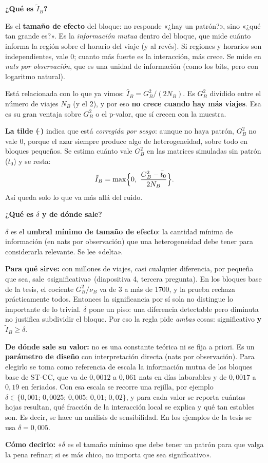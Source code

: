 \documentclass[11pt,a4paper]{article}
\newcommand{\cajainicio}[3]{\par\medskip\noindent
  \begin{lrbox}{\cajabox}\begin{minipage}{\dimexpr\linewidth-2\fboxsep-2\fboxrule\relax}%
  \textbf{\color{#1}#3}\par\smallskip}
\newcommand{\cajafin}[2]{\end{minipage}\end{lrbox}\fcolorbox{#1}{#2}{\usebox{\cajabox}}\par\medskip}
\newenvironment{nota}[1]{\cajainicio{acc}{acc!7}{#1}}{\cajafin{acc}{acc!7}}
\newcommand{\STCC}{ST-CC}
\begin{document}
\begin{nota}{¿Qué es $\tilde I_B$?}
Es el \textbf{tamaño de efecto} del bloque: no responde «¿hay un patrón?», sino «¿qué tan grande es?». Es la \emph{información mutua} dentro del bloque, que mide cuánto informa la región sobre el horario del viaje (y al revés). Si regiones y horarios son independientes, vale 0; cuanto más fuerte es la interacción, más crece. Se mide en \emph{nats por observación}, que es una unidad de información (como los bits, pero con logaritmo natural).

Está relacionada con lo que ya vimos: $\hat I_B=G^2_B/(2N_B)$. Es $G^2_B$ dividido entre el número de viajes $N_B$ (y el 2), y por eso \textbf{no crece cuando hay más viajes}. Esa es su gran ventaja sobre $G^2_B$ o el p-valor, que sí crecen con la muestra.

\textbf{La tilde ($\tilde{\ }$)} indica que está \emph{corregida por sesgo}: aunque no haya patrón, $G^2_B$ no vale 0, porque el azar siempre produce algo de heterogeneidad, sobre todo en bloques pequeños. Se estima cuánto vale $G^2_B$ en las matrices simuladas sin patrón ($\bar t_0$) y se resta:
\[ \tilde I_B=\max\Bigl\{0,\ \frac{G^2_B-\bar t_0}{2N_B}\Bigr\}. \]
Así queda solo lo que va más allá del ruido.
\end{nota}

\begin{nota}{¿Qué es $\delta$ y de dónde sale?}
$\delta$ es el \textbf{umbral mínimo de tamaño de efecto}: la cantidad mínima de información (en nats por observación) que una heterogeneidad debe tener para considerarla relevante. Se lee «delta».

\textbf{Para qué sirve:} con millones de viajes, casi cualquier diferencia, por pequeña que sea, sale «significativa» (diapositiva 4, tercera pregunta). En los bloques base de la tesis, el cociente $G^2_B/\nu_B$ va de 3 a más de 1700, y la prueba rechaza prácticamente todos. Entonces la significancia por sí sola no distingue lo importante de lo trivial. $\delta$ pone un piso: una diferencia detectable pero diminuta no justifica subdividir el bloque. Por eso la regla pide \emph{ambas} cosas: significativo \textbf{y} $\tilde I_B\ge\delta$.

\textbf{De dónde sale su valor:} no es una constante teórica ni se fija a priori. Es un \textbf{parámetro de diseño} con interpretación directa (nats por observación). Para elegirlo se toma como referencia de escala la información mutua de los bloques base de \STCC, que va de $0{,}0012$ a $0{,}061$ nats en días laborables y de $0{,}0017$ a $0{,}19$ en feriados. Con esa escala se recorre una rejilla, por ejemplo $\delta\in\{0{,}001;\,0{,}0025;\,0{,}005;\,0{,}01;\,0{,}02\}$, y para cada valor se reporta cuántas hojas resultan, qué fracción de la interacción local se explica y qué tan estables son. Es decir, se hace un análisis de sensibilidad. En los ejemplos de la tesis se usa $\delta=0{,}005$.

\textbf{Cómo decirlo:} «$\delta$ es el tamaño mínimo que debe tener un patrón para que valga la pena refinar; si es más chico, no importa que sea significativo».
\end{nota}
\end{document}
